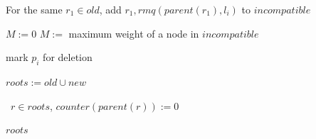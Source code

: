 \documentclass{article}
\begin{document}
\begin{algorithm}[ht]
\begin{algorithmic}[1]
                    \State For the same $r_1 \in old$, add $r_1, rmq(parent(r_1), l_i)$ to $incompatible$
                \EndIf

                    {$M := 0$}
                    $M :=$ maximum weight of a node in $incompatible$

                    mark $p_i$ for deletion

                \State $roots := old \cup new$
            \EndFor

            \State \algorithmicforall\ $r \in roots$, $counter(parent(r)) := 0$

            \State \Return $roots$
        \end{algorithmic}
    \end{algorithm}
\end{document}
